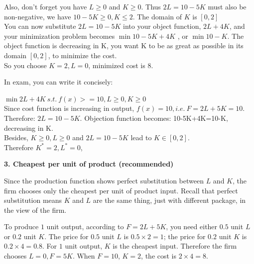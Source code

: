 \documentclass{article}
\begin{document}
Also, don't forget you have  $L\ge0$ and $K\ge0$.  Thus $2L=10-5K$ must also be non-negative, we have $10-5K \ge0, K\le2$. The domain of $K$ is $[0,2]$ \\
You can now substitute $2L=10-5K$ into your object function, $2L+4K$, and your minimization problem​ becomes $\min 10-5K +4K$ , or $\min 10 - K$. The object function is decreasing in K,  you want K to be as great as possible in its domain $[0,2]$, to minimize the cost. \\
So you choose $K=2, L=0$, minimized cost is $8$.
\medskip

In exam, you can write it concisely:
\medskip

 $\min 2L + 4K \  s.t. \  f(x) > = 10, L\ge0, K\ge0$ \\
Since cost function is increasing in output, $f(x)=10, i.e. \  F= 2L+5K=10$. Therefore: $2L=10-5K$.  Objection function becomes: 10-5K+4K=10-K, decreasing in K. \\
Besides, $K\ge0,  L\ge0$ and $2L=10-5K$  lead to $K \in [0,2]$. \\
Therefore $K^*=2, L^*=0$, 

\bigskip

\textbf{3. Cheapest per unit of product (recommended)}

Since the production function shows perfect substitution between $L$ and $K$, the firm chooses only the cheapest per unit of product input. Recall that perfect substitution means $K$ and $L$ are the same thing, just with different package, in the view of the firm.

\medskip
To produce $1$ unit output, according to $F = 2L+5K$, you need either $0.5$ unit $L$ or $0.2$ unit $K$. The price for $0.5$ unit $L$ is $0.5 \times 2 =1$; the price for $0.2$ unit $K​$ is $0.2 \times 4 =0.8$.
For $1$ unit output, $K$ is the cheapest input. Therefore the firm chooses $L=0, F=5K$. When $F=10$, $K=2$, the cost is $2 \times 4 =8$.
\end{document}
